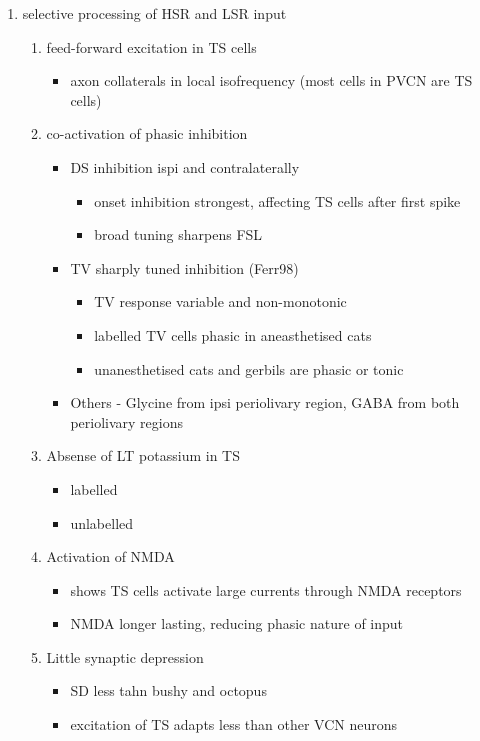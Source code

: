 \begin{enumerate}
\item selective processing of HSR and LSR input
\begin{enumerate}
\item feed-forward excitation in TS cells
\begin{itemize}
\item axon collaterals in local isofrequency (most cells in PVCN are TS cells)
\end{itemize}
\item co-activation of phasic inhibition
\begin{itemize}
\item DS inhibition ispi and contralaterally
\begin{itemize}
\item onset inhibition strongest, affecting TS cells after first spike
\item broad tuning sharpens FSL
\end{itemize}
\item TV sharply tuned inhibition (Ferr98)
\begin{itemize}
\item TV response variable and non-monotonic
\item \citep{Rhode:1999}  labelled TV cells phasic in aneasthetised cats
\item unanesthetised cats and gerbils are phasic or tonic  \citep{DingVoigt:1997,ShofnerYoung:1985}
\end{itemize}
\item Others - Glycine from ipsi periolivary region, GABA from both
          periolivary regions \citep{AdamsWarr:1976,ShoreHelfertEtAl:1991,OstapoffBensonEtAl:1997}
\end{itemize}
\item Absense of LT potassium in TS
\begin{itemize}
\item labelled \citep{ManisMarx:1991,BalOertel:2001,FerragamoOertel:2002,CaoShatadalEtAl:2007}
\item unlabelled \citep{RothmanManis:2003,RothmanManis:2003a,RothmanManis:2003b,Rothman:1999}
\end{itemize}
\item Activation of NMDA
\begin{itemize}
\item \citep{CaoOertel:2010} shows TS cells activate large currents through NMDA receptors
\item NMDA longer lasting, reducing phasic nature of input
\end{itemize}
\item Little synaptic depression
\begin{itemize}
\item SD less tahn bushy and octopus \citep{WuOertel:1987,ChandaXu-Friedman:2010,CaoOertel:2010}
\item excitation of TS adapts less than other VCN neurons
\end{itemize}
\end{enumerate}
\end{enumerate}

